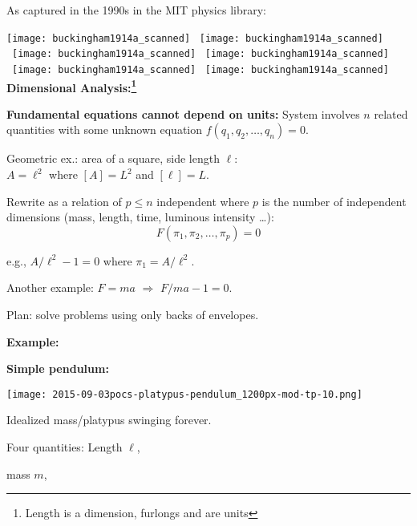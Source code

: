   \bigskip

  As captured in the 1990s in the MIT physics library:

  \medskip
  
  \texttt{[image: buckingham1914a\_scanned]}
  \
  \texttt{[image: buckingham1914a\_scanned]}
  \
  \texttt{[image: buckingham1914a\_scanned]}
  \
  \texttt{[image: buckingham1914a\_scanned]}
  \
  \texttt{[image: buckingham1914a\_scanned]}
  \
  \texttt{[image: buckingham1914a\_scanned]}
  \small
  \textbf{Dimensional Analysis:\footnote{Length is a dimension,
      furlongs and  are units}}

  \textbf{Fundamental equations cannot depend on units:}
      System involves $n$ related quantities with some unknown equation $f(q_1, q_2, \ldots, q_n) = 0$.
     
      Geometric ex.: area of a square, side length $\ell$:\\ 
      $A = \ell^2$ where $[A] = L^2$ and $[\ell] = L$.
     
      Rewrite as a relation of $p \le n$ independent
      where $p$ is the number of independent dimensions (mass, length,
      time, luminous intensity \ldots):
      $$
      F(\pi_1,\pi_2, \ldots, \pi_p) = 0
      $$
     
      e.g., $A/\ell^2 - 1 = 0$ where $\pi_1 = A/\ell^2$.
     
      Another example: $F = ma$ $\Rightarrow$ $F/ma - 1 = 0$.
     
      Plan: solve problems using only backs of envelopes.
  
  \textbf{Example:}

  \textbf{Simple pendulum:}
      
      \texttt{[image: 2015-09-03pocs-platypus-pendulum\_1200px-mod-tp-10.png]}
      
      
        Idealized mass/platypus swinging forever.
      
        Four quantities: 
          Length 
          $\ell$, 
         
          mass $m$, 
         
